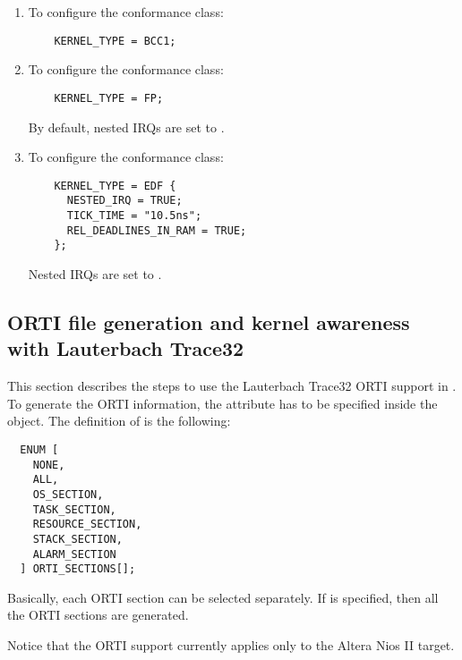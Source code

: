 \begin{enumerate}

\item
  To configure the  conformance class:
  \begin{lstlisting}
    KERNEL_TYPE = BCC1;
  \end{lstlisting}
  
\item
  To configure the  conformance class: 
  
  \begin{lstlisting}
    KERNEL_TYPE = FP;
  \end{lstlisting}
  
  By default, nested IRQs are set to .
  
\item
  To configure the  conformance class:
  
  \begin{lstlisting}
    KERNEL_TYPE = EDF { 
      NESTED_IRQ = TRUE; 
      TICK_TIME = "10.5ns"; 
      REL_DEADLINES_IN_RAM = TRUE;
    };
  \end{lstlisting}
  
  Nested IRQs are set to .
  
\end{enumerate}



\subsection{ORTI file generation and kernel awareness with Lauterbach Trace32}
\label{sub:orti}

This section describes the steps to use the Lauterbach Trace32 ORTI
support in \ee. To generate the ORTI information, the
 attribute has to be specified inside the
 object. The definition of  is the following:

\begin{lstlisting}
  ENUM [
    NONE,
    ALL,
    OS_SECTION,
    TASK_SECTION,
    RESOURCE_SECTION,
    STACK_SECTION,
    ALARM_SECTION
  ] ORTI_SECTIONS[];
\end{lstlisting}

Basically, each ORTI section can be selected separately. If
 is specified, then all the ORTI sections are generated.

Notice that the ORTI support currently applies only to the Altera Nios
II target.

